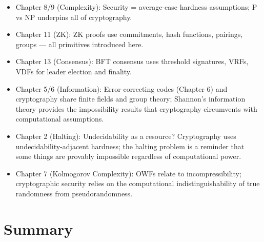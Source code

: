 \begin{itemize}
\item Chapter 8/9 (Complexity): Security = average-case hardness assumptions; P vs NP underpins all of cryptography.
\item Chapter 11 (ZK): ZK proofs use commitments, hash functions, pairings, groups — all primitives introduced here.
\item Chapter 13 (Consensus): BFT consensus uses threshold signatures, VRFs, VDFs for leader election and finality.
\item Chapter 5/6 (Information): Error-correcting codes (Chapter 6) and cryptography share finite fields and group theory; Shannon's information theory provides the impossibility results that cryptography circumvents with computational assumptions.
\item Chapter 2 (Halting): Undecidability as a resource? Cryptography uses undecidability-adjacent hardness; the halting problem is a reminder that some things are provably impossible regardless of computational power.
\item Chapter 7 (Kolmogorov Complexity): OWFs relate to incompressibility; cryptographic security relies on the computational indistinguishability of true randomness from pseudorandomness.
\end{itemize}

\section{Summary}
\label{sec:crypto:summary}

